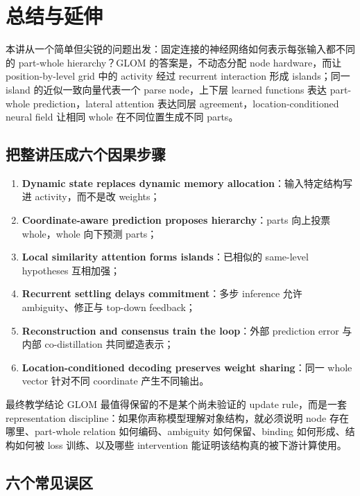 \section{总结与延伸}

本讲从一个简单但尖锐的问题出发：固定连接的神经网络如何表示每张输入都不同的 part-whole hierarchy？GLOM 的答案是，不动态分配 node hardware，而让 position-by-level grid 中的 activity 经过 recurrent interaction 形成 islands；同一 island 的近似一致向量代表一个 parse node，上下层 learned functions 表达 part-whole prediction，lateral attention 表达同层 agreement，location-conditioned neural field 让相同 whole 在不同位置生成不同 parts。

\subsection{把整讲压成六个因果步骤}

\begin{enumerate}
  \item \textbf{Dynamic state replaces dynamic memory allocation}：输入特定结构写进 activity，而不是改 weights；
  \item \textbf{Coordinate-aware prediction proposes hierarchy}：parts 向上投票 whole，whole 向下预测 parts；
  \item \textbf{Local similarity attention forms islands}：已相似的 same-level hypotheses 互相加强；
  \item \textbf{Recurrent settling delays commitment}：多步 inference 允许 ambiguity、修正与 top-down feedback；
  \item \textbf{Reconstruction and consensus train the loop}：外部 prediction error 与内部 co-distillation 共同塑造表示；
  \item \textbf{Location-conditioned decoding preserves weight sharing}：同一 whole vector 针对不同 coordinate 产生不同输出。
\end{enumerate}

\begin{importantbox}{最终教学结论}
GLOM 最值得保留的不是某个尚未验证的 update rule，而是一套 representation discipline：如果你声称模型理解对象结构，就必须说明 node 存在哪里、part-whole relation 如何编码、ambiguity 如何保留、binding 如何形成、结构如何被 loss 训练、以及哪些 intervention 能证明该结构真的被下游计算使用。
\end{importantbox}

\subsection{六个常见误区}

